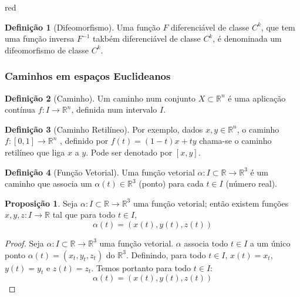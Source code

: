 \documentclass[12pt,leqno,twoside]{amsart}
\theoremstyle{definition}
\newtheorem{proposicao}{Proposição}[section]
\newtheorem{definicao}{Definição}[section]
\begin{document}
\begin{color}{red}
\vspace{0.3cm}

\begin{definicao}[Difeomorfismo]
	Uma função $F$ diferenciável de classe $C^k$, que tem uma função inversa $F^{-1}$ takbém diferenciável de classe $C^k$, é denominada um difeomorfismo de classe $C^k$.
\end{definicao}

\vspace{0.3cm}

\subsubsection{Caminhos em espaços Euclideanos}

\begin{definicao}[Caminho]
	Um caminho num conjunto $X\subset \mathbb{R}^n$  é uma aplicação contínua $f:I\to \mathbb{R}^n$, definida num intervalo $I$.
\end{definicao}

\vspace{0.3cm}

\begin{definicao}[Caminho Retilíneo]
	Por exemplo, dados $x,y \in \mathbb{R}^n$, o caminho $f: [0,1] \to \mathbb{R}^n$ , definido por $f(t) = (1 - t)x + ty$ chama-se o caminho retilíneo que liga $x$ a $y$. Pode ser denotado por $[x,y]$.
\end{definicao}



\begin{definicao}[Função Vetorial]
	Uma função vetorial $\alpha: I\subset \mathbb{R} \to \mathbb{R}^3$ é um caminho que associa um $\alpha(t)\in \mathbb{R}^3$ (ponto) para cada $t \in I$ (número real).
\end{definicao}

\begin{proposicao}
	Seja $\alpha: I\subset \mathbb{R} \to \mathbb{R}^3$ uma função vetorial; então existem funções $x,y,z:I\to \mathbb{R}$ tal que para todo $t\in I$, $$\alpha(t) =(x(t),y(t), z(t))$$
\end{proposicao}

\begin{proof}
	Seja $\alpha: I\subset \mathbb{R} \to \mathbb{R}^3$ uma função vetorial. $\alpha$ associa todo $t\in I$ a um único ponto $\alpha(t) = (x_t,y_t,z_t)$ do $\mathbb{R}^3$. Definindo, para todo $t \in I$,  $x(t) = x_t$, $y(t) = y_t$ e $z(t) = z_t$. Temos portanto para todo $t\in I$:$$\alpha(t) =(x(t),y(t), z(t))$$
\end{proof}


\end{color}
\end{document}
